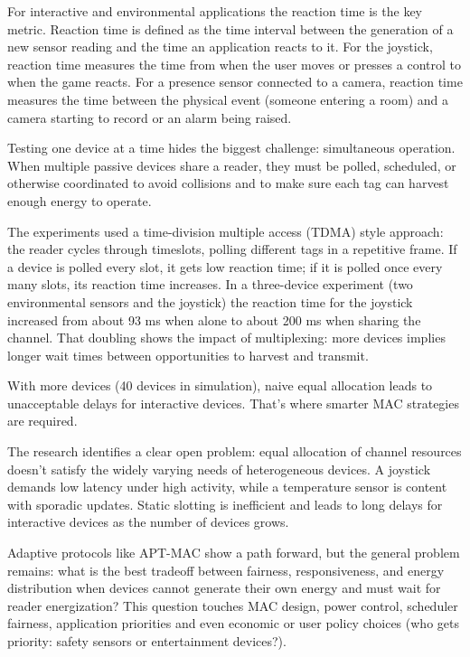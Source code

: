For interactive and environmental applications the reaction time is the key metric. Reaction time is defined as the time interval between the generation of a new sensor reading and the time an application reacts to it. For the joystick, reaction time measures the time from when the user moves or presses a control to when the game reacts. For a presence sensor connected to a camera, reaction time measures the time between the physical event (someone entering a room) and a camera starting to record or an alarm being raised.

Testing one device at a time hides the biggest challenge: simultaneous operation. When multiple passive devices share a reader, they must be polled, scheduled, or otherwise coordinated to avoid collisions and to make sure each tag can harvest enough energy to operate.

The experiments used a time-division multiple access (TDMA) style approach: the reader cycles through timeslots, polling different tags in a repetitive frame. If a device is polled every slot, it gets low reaction time; if it is polled once every many slots, its reaction time increases. In a three-device experiment (two environmental sensors and the joystick) the reaction time for the joystick increased from about 93 ms when alone to about 200 ms when sharing the channel. That doubling shows the impact of multiplexing: more devices implies longer wait times between opportunities to harvest and transmit.

With more devices (40 devices in simulation), naive equal allocation leads to unacceptable delays for interactive devices. That’s where smarter MAC strategies are required.

The research identifies a clear open problem: equal allocation of channel resources doesn’t satisfy the widely varying needs of heterogeneous devices. A joystick demands low latency under high activity, while a temperature sensor is content with sporadic updates. Static slotting is inefficient and leads to long delays for interactive devices as the number of devices grows.

Adaptive protocols like APT-MAC show a path forward, but the general problem remains: what is the best tradeoff between fairness, responsiveness, and energy distribution when devices cannot generate their own energy and must wait for reader energization? This question touches MAC design, power control, scheduler fairness, application priorities and even economic or user policy choices (who gets priority: safety sensors or entertainment devices?).

